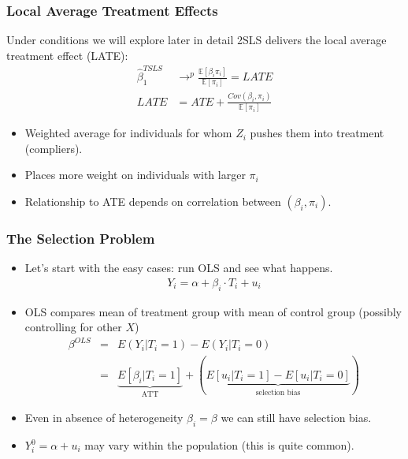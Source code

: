 \documentclass[xcolor=pdftex,dvipsnames,table,mathserif,aspectratio=169]{beamer}
\begin{document}
\begin{frame}
\frametitle{Local Average Treatment Effects}
Under conditions we will explore later in detail 2SLS delivers the \alert{local average treatment effect (LATE)}:
\begin{align*}
\widehat{\beta}_1^{TSLS} &\rightarrow^p \frac{\mathbb{E}[\beta_{i} \pi_{i}]}{\mathbb{E}[\pi_{i}]} = LATE \\
LATE &= ATE + \frac{Cov(\beta_{i},\pi_{i})}{\mathbb{E}[\pi_{i}]}
\end{align*}
\begin{itemize}
\item Weighted average for individuals for whom $Z_i$ pushes them into treatment (compliers).
\item Places more weight on individuals with larger $\pi_i$
\item Relationship to ATE depends on correlation between $(\beta_i, \pi_i)$.
\end{itemize}
\end{frame}


\begin{frame}
\frametitle{The Selection Problem}
\begin{itemize}
\item Let's start with the easy cases: run OLS and see what happens.
\begin{align*}
Y_i = \alpha + \beta_i \cdot T_i + u_i
\end{align*}
\item OLS compares mean of treatment group with mean of control group (possibly controlling for other $X$)
\begin{eqnarray*}
\beta^{OLS} &=& E(Y_i | T_i =1) - E(Y_i | T_i=0) \\
&=& \underbrace{E[\beta_i | T_i =1]}_{\mbox{ATT}} + \left(\underbrace{E[u_i | T_i =1 ] - E[u_i | T_i=0] }_{\mbox{selection bias}}  \right)
\end{eqnarray*}
\item Even in absence of heterogeneity $\beta_i = \beta$ we can still have selection bias. 
\item $Y_i^0 = \alpha + u_i$ may vary within the population (this is quite common).
\end{itemize}
\end{frame}
\end{document}
